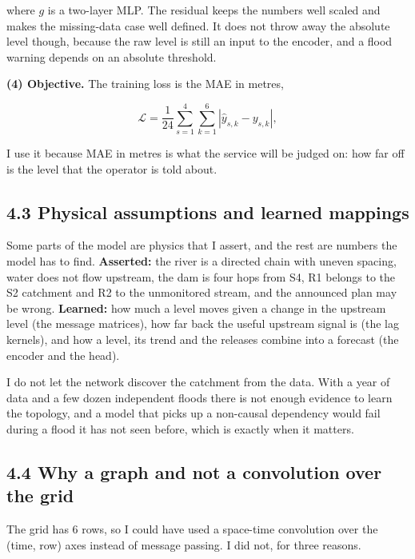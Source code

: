 \documentclass[11pt,letterpaper]{article}
\begin{document}
where $g$ is a two-layer MLP. The residual keeps the numbers well scaled and makes
the missing-data case well defined. It does not throw away the absolute level
though, because the raw level is still an input to the encoder, and a flood warning
depends on an absolute threshold.

\textbf{(4) Objective.} The training loss is the MAE in metres,

\begin{equation*}
\mathcal{L} = \frac{1}{24}\sum_{s=1}^{4}\sum_{k=1}^{6} \left| \hat y_{s,k} - y_{s,k} \right| ,
\end{equation*}

I use it because MAE in metres is what the service will be judged on: how far off
is the level that the operator is told about.

\subsection*{4.3 Physical assumptions and learned mappings}

Some parts of the model are physics that I assert, and the rest are numbers the
model has to find. \textbf{Asserted:} the river is a directed chain with uneven
spacing, water does not flow upstream, the dam is four hops from S4, R1 belongs to
the S2 catchment and R2 to the unmonitored stream, and the announced plan may be
wrong. \textbf{Learned:} how much a level moves given a change in the upstream
level (the message matrices), how far back the useful upstream signal is (the lag
kernels), and how a level, its trend and the releases combine into a forecast (the
encoder and the head).

I do not let the network discover the catchment from the data. With a year of data
and a few dozen independent floods there is not enough evidence to learn the
topology, and a model that picks up a non-causal dependency would fail during a
flood it has not seen before, which is exactly when it matters.

\subsection*{4.4 Why a graph and not a convolution over the grid}

The grid has 6 rows, so I could have used a space-time convolution over the
(time, row) axes instead of message passing. I did not, for three reasons.
\end{document}
